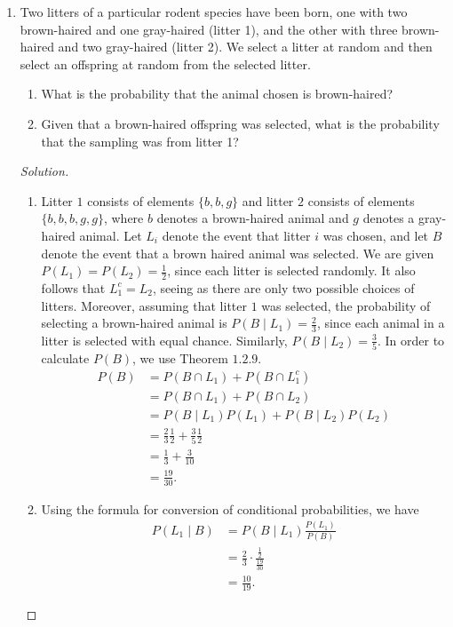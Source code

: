 \documentclass[12pt]{article}
\theoremstyle{definition}
\theoremstyle{plain}
\newenvironment{solution}
  {\begin{proof}[Solution]}
  {\end{proof}}
\begin{document}
\begin{enumerate}
\item Two litters of a particular rodent species have been born, one with two brown-haired and one gray-haired (litter 1), and the other with three brown-haired and two gray-haired (litter 2). We select a litter at random and then select an offspring at random from the selected litter.
\begin{enumerate}
\item What is the probability that the animal chosen is brown-haired?
\item Given that a brown-haired offspring was selected, what is the probability that the sampling was from litter 1?
\end{enumerate}

\begin{solution}
\begin{enumerate}
\item Litter $ 1 $ consists of elements $ \{ b, b, g \} $ and litter $ 2 $ consists of elements $ \{ b, b, b, g, g \} $, where $ b $ denotes a brown-haired animal and $ g $ denotes a gray-haired animal. Let $ L_i $ denote the event that litter $ i $ was chosen, and let $ B $ denote the event that a brown haired animal was selected. We are given $ P(L_1) = P(L_2) = \frac{1}{2} $, since each litter is selected randomly. It also follows that $ L_1^c = L_2 $, seeing as there are only two possible choices of litters. Moreover, assuming that litter $ 1 $ was selected, the probability of selecting a brown-haired animal is $ P(B \mid L_1) = \frac{2}{3} $, since each animal in a litter is selected with equal chance. Similarly, $ P(B \mid L_2) = \frac{3}{5} $. In order to calculate $ P(B) $, we use Theorem $ 1.2.9 $.
\begin{align*}
	P(B) &= P(B \cap L_1) + P(B \cap L_1^c)\\
	&= P(B \cap L_1) + P(B \cap L_2)\\
	&= P(B \mid L_1) P(L_1) + P(B \mid L_2) P(L_2)\\
	&= \frac{2}{3} \frac{1}{2} + \frac{3}{5} \frac{1}{2}\\
	&= \frac{1}{3} + \frac{3}{10}\\
	&= \frac{19}{30}.
\end{align*}

\item Using the formula for conversion of conditional probabilities, we have
\begin{align*}
	P(L_1 \mid B) &= P(B \mid L_1) \frac{P(L_1)}{P(B)}\\
	&= \frac{2}{3} \cdot \frac{ \frac{1}{2}} { \frac{19}{30}}\\
	&= \frac{10}{19}.
\end{align*}
\end{enumerate}
\end{solution}


\end{enumerate}
\end{document}
